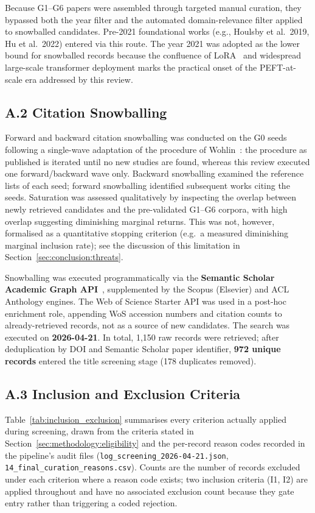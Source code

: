 Because G1--G6 papers were assembled through targeted manual curation, they
bypassed both the year filter and the automated domain-relevance filter
applied to snowballed candidates. Pre-2021 foundational works (e.g.,
Houlsby et al.\ 2019, Hu et al.\ 2022) entered via this route. The year 2021
was adopted as the lower bound for snowballed records because the confluence
of LoRA~\cite{Hu2022} and widespread large-scale transformer deployment marks
the practical onset of the PEFT-at-scale era addressed by this review.

\subsection*{A.2 Citation Snowballing}

Forward and backward citation snowballing was conducted on the G0 seeds
following a single-wave adaptation of the procedure of
Wohlin~\cite{Wohlin2014}: the procedure as published is iterated until no new
studies are found, whereas this review executed one forward/backward wave only.
Backward snowballing examined the reference lists of each seed; forward
snowballing identified subsequent works citing the seeds. Saturation was
assessed qualitatively by inspecting the overlap
between newly retrieved candidates and the pre-validated G1--G6 corpora, with
high overlap suggesting diminishing marginal returns. This was not, however,
formalised as a quantitative stopping criterion (e.g.\ a measured diminishing
marginal inclusion rate); see the discussion of this limitation in
Section~\ref{sec:conclusion:threats}.

Snowballing was executed programmatically via the \textbf{Semantic Scholar
Academic Graph API}~\cite{SemanticScholar2023}, supplemented by the Scopus
(Elsevier) and ACL Anthology engines. The Web of Science Starter API was used
in a post-hoc enrichment role, appending WoS accession numbers and citation
counts to already-retrieved records, not as a source of new candidates. The
search was executed on \textbf{2026-04-21}. In total, 1,150 raw records were
retrieved; after deduplication by DOI and Semantic Scholar paper identifier,
\textbf{972 unique records} entered the title screening stage (178 duplicates
removed).

\subsection*{A.3 Inclusion and Exclusion Criteria}

Table~\ref{tab:inclusion_exclusion} summarises every criterion actually
applied during screening, drawn from the criteria stated in
Section~\ref{sec:methodology:eligibility} and the per-record reason codes
recorded in the pipeline's audit files
(\texttt{log\_screening\_2026-04-21.json},
\texttt{14\_final\_curation\_reasons.csv}). Counts are the number of records
excluded under each criterion where a reason code exists; two inclusion
criteria (I1, I2) are applied throughout and have no associated exclusion
count because they gate entry rather than triggering a coded rejection.

